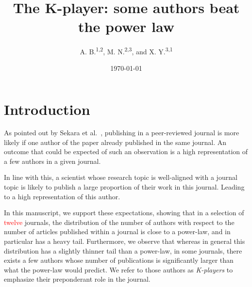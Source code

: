 \documentclass[aps,prl,floatfix,twocolumn]{revtex4-1}
\begin{document}
\title{The K-player: some authors beat the power law}

\author{A. B.\textsuperscript{1,2}, M. N.\textsuperscript{2,3}, and X. Y.\textsuperscript{3,1}}

\date{\today}

\begin{abstract}
 \textcolor{red}{\lipsum[1]}
\end{abstract}

\maketitle

\section{Introduction} 
As pointed out by Sekara et al.~\cite{Sek18}, publishing in a peer-reviewed journal is more likely if one author of the paper already published in the same journal.
An outcome that could be expected of such an observation is a high representation of a few authors in a given journal. 

In line with this, a scientist whose research topic is well-aligned with a journal topic is likely to publish a large proportion of their work in this journal.
Leading to a high representation of this author. 

In this manuscript, we support these expectations, showing that in a selection of \textcolor{red}{twelve} journals, the distribution of the number of authors with respect to the number of articles published within a journal is close to a power-law, and in particular has a heavy tail. 
Furthermore, we observe that whereas in general this distribution has a slightly thinner tail than a power-law, in some journals, there exists a few authors whose number of publications is significantly larger than what the power-law would predict. 
We refer to those authors as \emph{K-players} to emphasize their preponderant role in the journal. 
\end{document}
